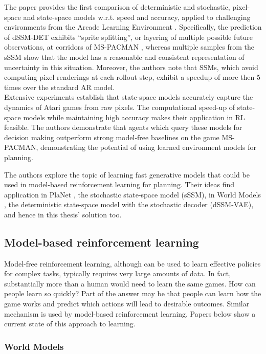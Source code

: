 The paper provides the first comparison of deterministic and stochastic, pixel-space and state-space models w.r.t. speed and accuracy, applied to challenging environments from the Arcade Learning Environment \cite{Code.ALE}. Specifically, the prediction of dSSM-DET exhibits “sprite splitting”, or layering of multiple possible future observations, at corridors of MS-PACMAN \cite{Game.MSPACMAN}, whereas multiple samples from the sSSM show that the model has a reasonable and consistent representation of uncertainty in this situation. Moreover, the authors note that SSMs, which avoid computing pixel renderings at each rollout step, exhibit a speedup of more then 5 times over the standard AR model. \\
Extensive experiments establish that state-space models accurately capture the dynamics of Atari games from raw pixels. The computational speed-up of state-space models while maintaining high accuracy makes their application in RL feasible. The authors demonstrate that agents which query these models for decision making outperform strong model-free baselines on the game MS-PACMAN, demonstrating the potential of using learned environment models for planning.

The authors explore the topic of learning fast generative models that could be used in model-based reinforcement learning for planning. Their ideas find application in PlaNet \cite{Algo.PlaNet}, the stochastic state-space model (sSSM), in World Models \cite{Algo.WorldModels}, the deterministic state-space model with the stochastic decoder (dSSM-VAE), and hence in this thesis' solution too.

\subsection{Model-based reinforcement learning}

Model-free reinforcement learning, although can be used to learn effective policies for complex tasks, typically requires very large amounts of data. In fact, substantially more than a human would need to learn the same games. How can people learn so quickly? Part of the answer may be that people can learn how the game works and predict which actions will lead to desirable outcomes. Similar mechanism is used by model-based reinforcement learning. Papers below show a current state of this approach to learning.

\subsubsection{World Models}

